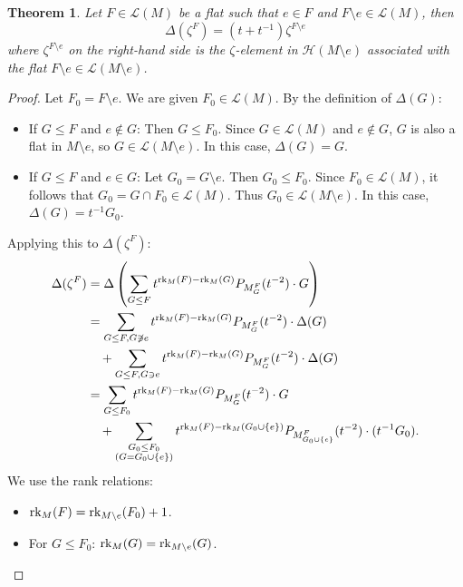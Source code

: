 \documentclass[11pt]{article}
\newcommand{\calL}{\mathcal{L}}
\newcommand{\calH}{\mathcal{H}}
\newcommand{\rank}{\normalfont\text{rk}}
\newtheorem{theorem}{Theorem}
\theoremstyle{remark}
\begin{document}
\begin{theorem}
    \label{thm:delta_zeta_special_case}
    Let $F \in \calL(M)$ be a flat such that $e \in F$ and $F\setminus e \in \calL(M)$, then
    \[ \Delta(\zeta^F) = (t + t^{-1})\zeta^{F\setminus e} \]
    where $\zeta^{F\setminus e}$ on the right-hand side is the $\zeta$-element in
    $\calH(M\setminus e)$ associated with the flat $F\setminus e \in \calL(M\setminus e)$.
\end{theorem}
\begin{proof}
    Let $F_0 = F\setminus e$. We are given $F_0 \in \calL(M)$.
    By the definition of $\Delta(G)$:
    \begin{itemize}
        \item If $G \leq F$ and $e \notin G$: Then $G \leq F_0$. Since $G \in \calL(M)$ and $e \notin G$, $G$ is also a flat in $M\setminus e$, so $G \in \calL(M\setminus e)$. In this case, $\Delta(G) = G$.
        \item If $G \leq F$ and $e \in G$: Let $G_0 = G\setminus e$. Then $G_0 \leq F_0$. Since $F_0 \in \calL(M)$, it follows that $G_0 = G \cap F_0 \in \calL(M)$. Thus $G_0 \in \calL(M\setminus e)$. In this case, $\Delta(G) = t^{-1}G_0$.
    \end{itemize}
    Applying this to $\Delta(\zeta^F)$:
    \begin{align*}
        \Delta(\zeta^F) & = \Delta \left( \sum_{G \leq F} t^{\rank_M(F) - \rank_M(G)} P_{M_G^F}(t^{-2}) \cdot G \right)  \\
                        & = \sum_{G \leq F, G \not\ni e} t^{\rank_M(F) - \rank_M(G)} P_{M_G^F}(t^{-2}) \cdot \Delta(G)   \\
                        & \quad + \sum_{G \leq F, G \ni e} t^{\rank_M(F) - \rank_M(G)} P_{M_G^F}(t^{-2}) \cdot \Delta(G) \\
                        & = \sum_{G \leq F_0} t^{\rank_M(F) - \rank_M(G)} P_{M_G^F}(t^{-2}) \cdot G                      \\
                        & \quad + \sum_{\substack{G_0 \leq F_0                                                           \\ (G = G_0 \cup \{e\})}} t^{\rank_M(F) - \rank_M(G_0 \cup \{e\})} P_{M_{G_0 \cup \{e\}}^{F}}(t^{-2}) \cdot (t^{-1}G_0).
    \end{align*}
    We use the rank relations:
    \begin{itemize}
        \item $\rank_M(F) = \rank_{M\setminus e}(F_0) + 1$.
        \item For $G \leq F_0$: $\rank_M(G) = \rank_{M\setminus e}(G)$.

\end{itemize}
\end{proof}
\end{document}
